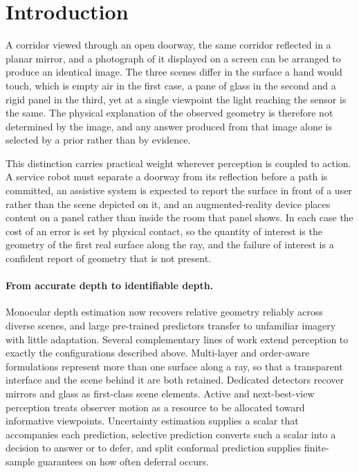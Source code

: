 \section{Introduction}
\label{sec:introduction}

A corridor viewed through an open doorway, the same corridor reflected in a
planar mirror, and a photograph of it displayed on a screen can be arranged to
produce an identical image. The three scenes differ in the surface a hand would
touch, which is empty air in the first case, a pane of glass in the second and a
rigid panel in the third, yet at a single viewpoint the light reaching the sensor
is the same. The physical explanation of the observed geometry is therefore not
determined by the image, and any answer produced from that image alone is
selected by a prior rather than by evidence.

This distinction carries practical weight wherever perception is coupled to
action. A service robot must separate a doorway from its reflection before a path
is committed, an assistive system is expected to report the surface in front of a
user rather than the scene depicted on it, and an augmented-reality device places
content on a panel rather than inside the room that panel shows. In each case the
cost of an error is set by physical contact, so the quantity of interest is the
geometry of the first real surface along the ray, and the failure of interest is a
confident report of geometry that is not present.

\paragraph{From accurate depth to identifiable depth.}
Monocular depth estimation now recovers relative geometry reliably across diverse
scenes, and large pre-trained predictors transfer to unfamiliar imagery with
little adaptation. Several complementary lines of work extend perception to
exactly the configurations described above. Multi-layer and order-aware
formulations represent more than one surface along a ray, so that a transparent
interface and the scene behind it are both retained. Dedicated detectors recover
mirrors and glass as first-class scene elements. Active and next-best-view
perception treats observer motion as a resource to be allocated toward informative
viewpoints. Uncertainty estimation supplies a scalar that accompanies each
prediction, selective prediction converts such a scalar into a decision to answer
or to defer, and split conformal prediction supplies finite-sample guarantees on
how often deferral occurs.

